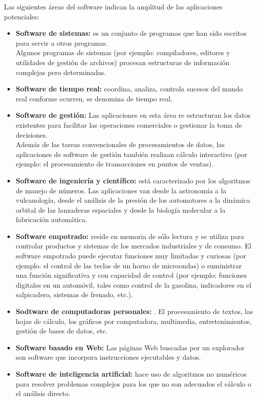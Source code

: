 \documentclass[12pt,twoside]{article}
\begin{document}
Las siguientes áreas del software indican la amplitud de las aplicaciones potenciales:
\begin{itemize}
    \item \textbf{ Software de sistemas:} es un conjunto de programas que han sido escritos 
    para servir a otros programas.\\
    Algunos programas de sistemas (por ejemplo: compiladores, editores y utilidades de gestión 
    de archivos) procesan estructuras de información complejas pero determinadas.
    \item \textbf{ Software de tiempo real:}  coordina, analiza, controla sucesos del mundo 
    real conforme ocurren, se denomina de tiempo real.
    \item \textbf{ Software de gestión:} Las aplicaciones en esta área re estructuran los datos 
    existentes para facilitar las operaciones comerciales o gestionar la toma de decisiones. \\
    Además de las tareas convencionales de procesamientos de datos, las aplicaciones de software 
    de gestión también realizan cálculo interactivo (por ejemplo: el procesamiento de transacciones 
    en puntos de ventas).
    \item \textbf{ Software de ingeniería y científico:} está caracterizado por los algoritmos 
    de manejo de números. Las aplicaciones van desde la astronomía a la vulcanología, 
    desde el análisis de la presión de los automotores a la dinámica orbital de las 
    lanzaderas espaciales y desde la biología molecular a la fabricación automática.
    \item \textbf{ Software empotrado:} reside en memoria de sólo lectura y se
    utiliza para controlar productos y sistemas de los mercados industriales y de consumo. El
    software empotrado puede ejecutar funciones muy limitadas y curiosas (por ejemplo: el
    control de las teclas de un horno de microondas) o suministrar una función significativa y
    con capacidad de control (por ejemplo: funciones digitales en un automóvil, tales como
    control de la gasolina, indicadores en el salpicadero, sistemas de frenado, etc.).
    \item \textbf{ Sodtware de computadoras personales:} . El
    procesamiento de textos, las hojas de cálculo, los gráficos por computadora, multimedia,
    entretenimientos, gestión de bases de datos, etc.
    \item \textbf{ Software basado en Web:} Las páginas Web buscadas por un explorador son 
    software que incorpora instrucciones ejecutables y datos.
    \item \textbf{ Software de inteligencia artificial:} hace uso de algoritmos no
    numéricos para resolver problemas complejos para los que no son
    adecuados el cálculo o el análisis directo.
\end{itemize}
\end{document}
